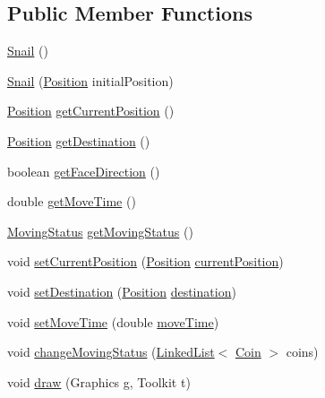\subsection*{Public Member Functions}
\begin{DoxyCompactItemize}
\item 
\mbox{\hyperlink{class_snail_ad38cb99dcf99a4da1651050c10cb26e1}{Snail}} ()
\item 
\mbox{\hyperlink{class_snail_a5750040bdce708c8f89d6048c8deddf5}{Snail}} (\mbox{\hyperlink{class_position}{Position}} initial\+Position)
\item 
\mbox{\hyperlink{class_position}{Position}} \mbox{\hyperlink{class_snail_a0617eb72efb8c5f88cbad6dd5d68dafd}{get\+Current\+Position}} ()
\item 
\mbox{\hyperlink{class_position}{Position}} \mbox{\hyperlink{class_snail_a20209772994cb11ba8b25e5b70f075b8}{get\+Destination}} ()
\item 
boolean \mbox{\hyperlink{class_snail_aea3bd82a39b5054e8b1c096a163d22ac}{get\+Face\+Direction}} ()
\item 
double \mbox{\hyperlink{class_snail_a178f903a2db7511a95ee194eeba7c00a}{get\+Move\+Time}} ()
\item 
\mbox{\hyperlink{enum_moving_object_1_1_moving_status}{Moving\+Status}} \mbox{\hyperlink{class_snail_a454a3cf01af0437da61e1a503ca2bb30}{get\+Moving\+Status}} ()
\item 
void \mbox{\hyperlink{class_snail_accd27e2c8c8fd9522eaaf07249e37401}{set\+Current\+Position}} (\mbox{\hyperlink{class_position}{Position}} \mbox{\hyperlink{class_snail_a546a453e906d3fc883d3ce5d2aa44915}{current\+Position}})
\item 
void \mbox{\hyperlink{class_snail_a238dee1b989badf9c6d915a5185a1a47}{set\+Destination}} (\mbox{\hyperlink{class_position}{Position}} \mbox{\hyperlink{class_snail_a93d9364d2800a8ad4ca04e0a4646e3d6}{destination}})
\item 
void \mbox{\hyperlink{class_snail_a0b09291bb1de38a10051f96d2415fd3e}{set\+Move\+Time}} (double \mbox{\hyperlink{class_snail_a4d00c96144349b1f5e42c32cdd47d254}{move\+Time}})
\item 
void \mbox{\hyperlink{class_snail_a1ac3de4bd120dcfeae9ccc66918057e5}{change\+Moving\+Status}} (\mbox{\hyperlink{class_linked_list}{Linked\+List}}$<$ \mbox{\hyperlink{class_coin}{Coin}} $>$ coins)
\item 
void \mbox{\hyperlink{class_snail_aa39dc71c305e7034af0438f036232e43}{draw}} (Graphics g, Toolkit t)
\end{DoxyCompactItemize}
